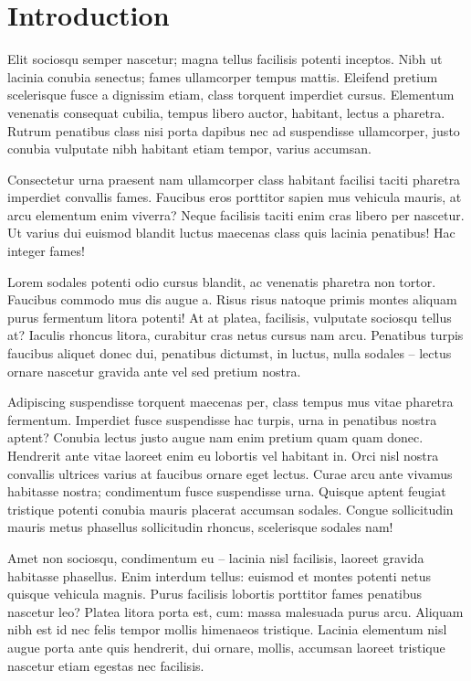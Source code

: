 \documentclass[preprint, 3p,
authoryear]{elsarticle} %
\begin{document}
\hypertarget{introduction}{%
\section{Introduction}\label{introduction}}

Elit sociosqu semper nascetur; magna tellus facilisis potenti inceptos.
Nibh ut lacinia conubia senectus; fames ullamcorper tempus mattis.
Eleifend pretium scelerisque fusce a dignissim etiam, class torquent
imperdiet cursus. Elementum venenatis consequat cubilia, tempus libero
auctor, habitant, lectus a pharetra. Rutrum penatibus class nisi porta
dapibus nec ad suspendisse ullamcorper, justo conubia vulputate nibh
habitant etiam tempor, varius accumsan.

Consectetur urna praesent nam ullamcorper class habitant facilisi taciti
pharetra imperdiet convallis fames. Faucibus eros porttitor sapien mus
vehicula mauris, at arcu elementum enim viverra? Neque facilisis taciti
enim cras libero per nascetur. Ut varius dui euismod blandit luctus
maecenas class quis lacinia penatibus! Hac integer fames!

Lorem sodales potenti odio cursus blandit, ac venenatis pharetra non
tortor. Faucibus commodo mus dis augue a. Risus risus natoque primis
montes aliquam purus fermentum litora potenti! At at platea, facilisis,
vulputate sociosqu tellus at? Iaculis rhoncus litora, curabitur cras
netus cursus nam arcu. Penatibus turpis faucibus aliquet donec dui,
penatibus dictumst, in luctus, nulla sodales -- lectus ornare nascetur
gravida ante vel sed pretium nostra.

Adipiscing suspendisse torquent maecenas per, class tempus mus vitae
pharetra fermentum. Imperdiet fusce suspendisse hac turpis, urna in
penatibus nostra aptent? Conubia lectus justo augue nam enim pretium
quam quam donec. Hendrerit ante vitae laoreet enim eu lobortis vel
habitant in. Orci nisl nostra convallis ultrices varius at faucibus
ornare eget lectus. Curae arcu ante vivamus habitasse nostra;
condimentum fusce suspendisse urna. Quisque aptent feugiat tristique
potenti conubia mauris placerat accumsan sodales. Congue sollicitudin
mauris metus phasellus sollicitudin rhoncus, scelerisque sodales nam!

Amet non sociosqu, condimentum eu -- lacinia nisl facilisis, laoreet
gravida habitasse phasellus. Enim interdum tellus: euismod et montes
potenti netus quisque vehicula magnis. Purus facilisis lobortis
porttitor fames penatibus nascetur leo? Platea litora porta est, cum:
massa malesuada purus arcu. Aliquam nibh est id nec felis tempor mollis
himenaeos tristique. Lacinia elementum nisl augue porta ante quis
hendrerit, dui ornare, mollis, accumsan laoreet tristique nascetur etiam
egestas nec facilisis.
\end{document}

